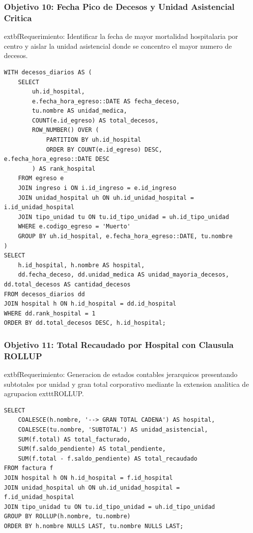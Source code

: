 \documentclass[11pt,a4paper]{article}
\begin{document}
\subsubsection{Objetivo 10: Fecha Pico de Decesos y Unidad Asistencial Critica}
	extbf{Requerimiento:} Identificar la fecha de mayor mortalidad hospitalaria por centro y aislar la unidad asistencial donde se concentro el mayor numero de decesos.
\begin{lstlisting}[style=sqlstyle]
WITH decesos_diarios AS (
    SELECT 
        uh.id_hospital,
        e.fecha_hora_egreso::DATE AS fecha_deceso,
        tu.nombre AS unidad_medica,
        COUNT(e.id_egreso) AS total_decesos,
        ROW_NUMBER() OVER (
            PARTITION BY uh.id_hospital 
            ORDER BY COUNT(e.id_egreso) DESC, e.fecha_hora_egreso::DATE DESC
        ) AS rank_hospital
    FROM egreso e
    JOIN ingreso i ON i.id_ingreso = e.id_ingreso
    JOIN unidad_hospital uh ON uh.id_unidad_hospital = i.id_unidad_hospital
    JOIN tipo_unidad tu ON tu.id_tipo_unidad = uh.id_tipo_unidad
    WHERE e.codigo_egreso = 'Muerto'
    GROUP BY uh.id_hospital, e.fecha_hora_egreso::DATE, tu.nombre
)
SELECT 
    h.id_hospital, h.nombre AS hospital,
    dd.fecha_deceso, dd.unidad_medica AS unidad_mayoria_decesos, dd.total_decesos AS cantidad_decesos
FROM decesos_diarios dd
JOIN hospital h ON h.id_hospital = dd.id_hospital
WHERE dd.rank_hospital = 1
ORDER BY dd.total_decesos DESC, h.id_hospital;
\end{lstlisting}

\subsubsection{Objetivo 11: Total Recaudado por Hospital con Clausula ROLLUP}
	extbf{Requerimiento:} Generacion de estados contables jerarquicos presentando subtotales por unidad y gran total corporativo mediante la extension analitica de agrupacion 	exttt{ROLLUP}.
\begin{lstlisting}[style=sqlstyle]
SELECT 
    COALESCE(h.nombre, '--> GRAN TOTAL CADENA') AS hospital,
    COALESCE(tu.nombre, 'SUBTOTAL') AS unidad_asistencial,
    SUM(f.total) AS total_facturado,
    SUM(f.saldo_pendiente) AS total_pendiente,
    SUM(f.total - f.saldo_pendiente) AS total_recaudado
FROM factura f
JOIN hospital h ON h.id_hospital = f.id_hospital
JOIN unidad_hospital uh ON uh.id_unidad_hospital = f.id_unidad_hospital
JOIN tipo_unidad tu ON tu.id_tipo_unidad = uh.id_tipo_unidad
GROUP BY ROLLUP(h.nombre, tu.nombre)
ORDER BY h.nombre NULLS LAST, tu.nombre NULLS LAST;
\end{lstlisting}
\end{document}

